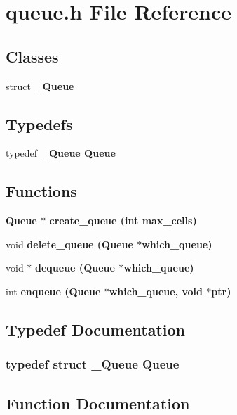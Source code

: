 \section{queue.h File Reference}
\label{queue_8h}
\subsection*{Classes}
\begin{CompactItemize}
\item 
struct \bf{\_\-Queue}
\end{CompactItemize}
\subsection*{Typedefs}
\begin{CompactItemize}
\item 
typedef \bf{\_\-Queue} \bf{Queue}
\end{CompactItemize}
\subsection*{Functions}
\begin{CompactItemize}
\item 
\bf{Queue} $\ast$ \bf{create\_\-queue} (int max\_\-cells)
\item 
void \bf{delete\_\-queue} (\bf{Queue} $\ast$which\_\-queue)
\item 
void $\ast$ \bf{dequeue} (\bf{Queue} $\ast$which\_\-queue)
\item 
int \bf{enqueue} (\bf{Queue} $\ast$which\_\-queue, void $\ast$ptr)
\end{CompactItemize}


\subsection{Typedef Documentation}
\subsubsection{\setlength{\rightskip}{0pt plus 5cm}typedef struct \bf{\_\-Queue} \bf{Queue}}\label{queue_8h_aa31d02f2b2876d12bb8f83900eacce6}




\subsection{Function Documentation}
